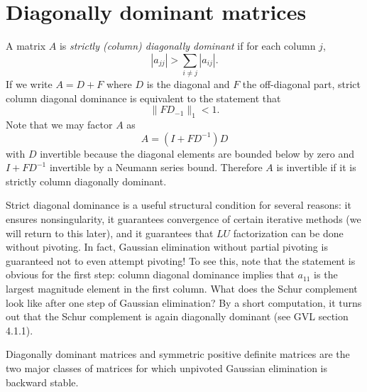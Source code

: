 \section{Diagonally dominant matrices}

A matrix $A$ is {\em strictly (column) diagonally dominant} if
for each column $j$,
\[
  |a_{jj}| > \sum_{i \neq j} |a_{ij}|.
\]
If we write $A = D + F$ where $D$ is the diagonal and $F$ the
off-diagonal part, strict column diagonal dominance is equivalent
to the statement that
\[
  \|FD_{-1}\|_1 < 1.
\]
Note that we may factor $A$ as
\[
  A = (I+FD^{-1}) D
\]
with $D$ invertible because the diagonal elements are bounded below
by zero and $I+FD^{-1}$ invertible by a Neumann series bound.
Therefore $A$ is invertible if it is strictly column diagonally
dominant.

Strict diagonal dominance is a useful structural condition for
several reasons: it ensures nonsingularity, it guarantees convergence
of certain iterative methods (we will return to this later), and it
guarantees that $LU$ factorization can be done without pivoting.
In fact, Gaussian elimination without partial pivoting is guaranteed
not to even attempt pivoting!  To see this, note that the statement
is obvious for the first step: column diagonal dominance implies
that $a_{11}$ is the largest magnitude element in the first column.
What does the Schur complement look like after one step of Gaussian
elimination?  By a short computation, it turns out that the Schur
complement is again diagonally dominant (see GVL section 4.1.1).

Diagonally dominant matrices and symmetric positive definite matrices
are the two major classes of matrices for which unpivoted Gaussian
elimination is backward stable.
